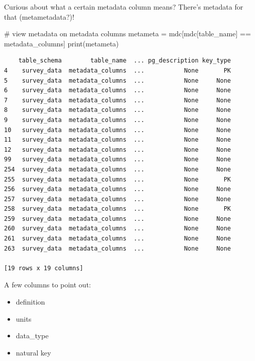 \documentclass[
  letterpaper,
  DIV=11,
  numbers=noendperiod]{scrartcl}
\newenvironment{Shaded}{\begin{snugshade}}{\end{snugshade}}
\newcommand{\BuiltInTok}[1]{\textcolor[rgb]{0.00,0.23,0.31}{#1}}
\newcommand{\CommentTok}[1]{\textcolor[rgb]{0.37,0.37,0.37}{#1}}
\newcommand{\NormalTok}[1]{\textcolor[rgb]{0.00,0.23,0.31}{#1}}
\newcommand{\OperatorTok}[1]{\textcolor[rgb]{0.37,0.37,0.37}{#1}}
\newcommand{\StringTok}[1]{\textcolor[rgb]{0.13,0.47,0.30}{#1}}
\providecommand{\tightlist}{%
  \setlength{\itemsep}{0pt}\setlength{\parskip}{0pt}}\usepackage{longtable,booktabs,array}
\begin{document}
Curious about what a certain metadata column means? There's metadata for
that (metametadata?)!

\begin{Shaded}
\begin{Highlighting}[]
\CommentTok{\# view metadata on metadata columns}
\NormalTok{metameta }\OperatorTok{=}\NormalTok{ mdc[mdc[}\StringTok{\textquotesingle{}table\_name\textquotesingle{}}\NormalTok{] }\OperatorTok{==} \StringTok{\textquotesingle{}metadata\_columns\textquotesingle{}}\NormalTok{]}
\BuiltInTok{print}\NormalTok{(metameta)}
\end{Highlighting}
\end{Shaded}

\begin{verbatim}
    table_schema        table_name  ... pg_description key_type
4    survey_data  metadata_columns  ...           None       PK
5    survey_data  metadata_columns  ...           None     None
6    survey_data  metadata_columns  ...           None     None
7    survey_data  metadata_columns  ...           None     None
8    survey_data  metadata_columns  ...           None     None
9    survey_data  metadata_columns  ...           None     None
10   survey_data  metadata_columns  ...           None     None
11   survey_data  metadata_columns  ...           None     None
12   survey_data  metadata_columns  ...           None     None
99   survey_data  metadata_columns  ...           None     None
254  survey_data  metadata_columns  ...           None     None
255  survey_data  metadata_columns  ...           None       PK
256  survey_data  metadata_columns  ...           None     None
257  survey_data  metadata_columns  ...           None     None
258  survey_data  metadata_columns  ...           None       PK
259  survey_data  metadata_columns  ...           None     None
260  survey_data  metadata_columns  ...           None     None
261  survey_data  metadata_columns  ...           None     None
263  survey_data  metadata_columns  ...           None     None

[19 rows x 19 columns]
\end{verbatim}

A few columns to point out:

\begin{itemize}
\tightlist
\item
  definition
\item
  units
\item
  data\_type
\item
  natural key
\end{itemize}
\end{document}
